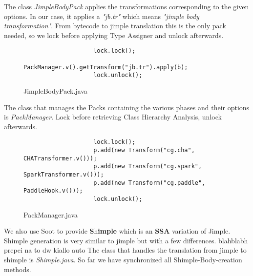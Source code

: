 \documentclass{dithesis}
\begin{document}
	    	The class \textit{JimpleBodyPack} applies the transformations corresponding to the given options. In our case, it applies a \textit{"jb.tr"} which means \textit{"jimple body transformation"}. From bytecode to jimple translation this is the only pack needed, so we lock before applying Type Assigner and unlock afterwards.
	    	\begin{figure}[H]
	            \begin{lstlisting}
			    	lock.lock();
					PackManager.v().getTransform("jb.tr").apply(b);
					lock.unlock();
				\end{lstlisting}
	        \caption{JimpleBodyPack.java}
	        \end{figure}

	    	The class that manages the Packs containing the various phases and their options is \textit{PackManager}. Lock before retrieving Class Hierarchy Analysis, unlock afterwards.
			\begin{figure}[H]
	            \begin{lstlisting}
					lock.lock();
					p.add(new Transform("cg.cha", CHATransformer.v()));
					p.add(new Transform("cg.spark", SparkTransformer.v()));
					p.add(new Transform("cg.paddle", PaddleHook.v()));
					lock.unlock();
				\end{lstlisting}
	        \caption{PackManager.java}
	        \end{figure}

	    	We also use Soot to provide \textbf{S}h\textbf{imple} which is an \textbf{SSA} variation of Jimple. Shimple generation is very similar to jimple but with a few differences. 
	    	blahblabh prepei na to dw kiallo auto
	    	The class that handles the translation from jimple to shimple is \textit{Shimple.java}. So far we have synchronized all Shimple-Body-creation methods.
\end{document}
